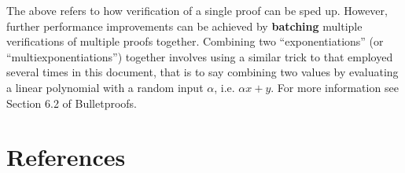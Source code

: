 \documentclass[10pt,a4paper]{article}
\begin{document}
The above refers to how verification of a single proof can be sped up.
However, further performance improvements can be achieved by
\textbf{batching} multiple verifications of multiple proofs together.
Combining two ``exponentiations'' (or ``multiexponentiations'') together
involves using a similar trick to that employed several times in this
document, that is to say combining two values by evaluating a linear
polynomial with a random input $\alpha$, i.e. $\alpha x + y$. For more information see Section
6.2 of Bulletproofs.

\hypertarget{references}{%
\section[References]{\texorpdfstring{\protect\hypertarget{anchor-77}{}{}References}{References}}\label{references}}
\end{document}
